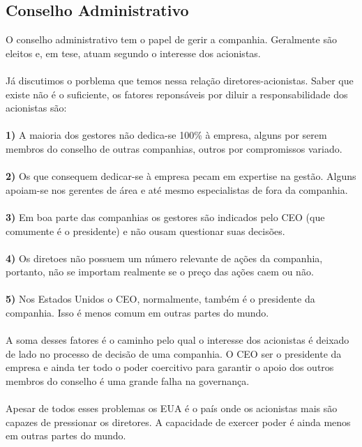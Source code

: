 \subsection*{Conselho Administrativo}
O conselho administrativo tem o papel de gerir a companhia. Geralmente são eleitos e, em tese, atuam segundo o interesse dos acionistas.
\\~\\
Já discutimos o porblema que temos nessa relação diretores-acionistas. Saber que existe não é o suficiente, os fatores reponsáveis por diluir a responsabilidade dos acionistas são:
\\~\\
\textbf{1)} A maioria dos gestores não dedica-se 100\% à empresa, alguns por serem membros do conselho de outras companhias, outros por compromissos variado.
\\~\\
\textbf{2)} Os que consequem dedicar-se à empresa pecam em expertise na gestão. Alguns apoiam-se nos gerentes de área e até mesmo especialistas de fora da companhia.
\\~\\
\textbf{3)} Em boa parte das companhias os gestores são indicados pelo CEO (que comumente é o presidente) e não ousam questionar suas decisões.
\\~\\
\textbf{4)} Os diretoes não possuem um número relevante de ações da companhia, portanto, não se importam realmente se o preço das ações caem ou não.
\\~\\
\textbf{5)} Nos Estados Unidos o CEO, normalmente, também é o presidente da companhia. Isso é menos comum em outras partes do mundo.
\\~\\
A soma desses fatores é o caminho pelo qual o interesse dos acionistas é deixado de lado no processo de decisão de uma companhia. O CEO ser o presidente da empresa e ainda ter todo o poder coercitivo para garantir o apoio dos outros membros do conselho é uma grande falha na governança.
\\~\\
Apesar de todos esses problemas os EUA é o país onde os acionistas mais são capazes de pressionar os diretores. A capacidade de exercer poder é ainda menos em outras partes do mundo.
